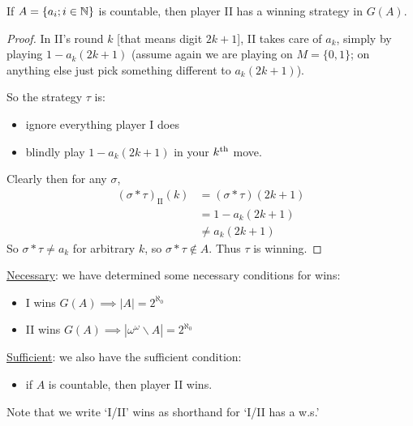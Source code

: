 \documentclass[]{article}
\newcommand{\II}{\textrm{II}}
\newcommand{\om}{\omega}
\begin{document}
\begin{remark}[Proposition]
    If $A = \{a_i;i \in \mathbb{N}\}$ is countable, then player II has a winning strategy in $G(A)$.
\end{remark}
\begin{proof}
    In II's round $k$ [that means digit $2k+1$], II takes care of $a_k$, simply by playing $1 - a_k(2k+1)$ (assume again we are playing on $M = \{0,1\}$; on anything else just pick something different to $a_k(2k+1)$).

    So the strategy $\tau$ is:
    \begin{itemize}
        \item ignore everything player I does
        \item blindly play $1 - a_k(2k+1)$ in your $k^{\textrm{th}}$ move.
    \end{itemize}

    Clearly then for any $\sigma$,
    \begin{align*}
        (\sigma\ast \tau)_\II(k) &= (\sigma \ast \tau)(2k+1)\\
        &= 1 - a_k(2k+1)\\
        &\ne a_k(2k+1)
    \end{align*}
    So $\sigma \ast \tau\ne a_k$ for arbitrary $k$, so $\sigma\ast \tau \not \in A$. Thus $\tau$ is winning.
\end{proof}


\underline{Necessary}: we have determined some necessary conditions for wins:
\begin{itemize}
    \item I wins $G(A)\implies |A| = 2^{\aleph_0}$
    \item II wins $G(A)\implies |\om^\om\backslash A| = 2^{\aleph_0}$
\end{itemize}
\underline{Sufficient}: we also have the sufficient condition:
\begin{itemize}
    \item if $A$ is countable, then player II wins.
\end{itemize}

Note that we write `I/II' wins as shorthand for `I/II has a w.s.'
\ \\
\end{document}
